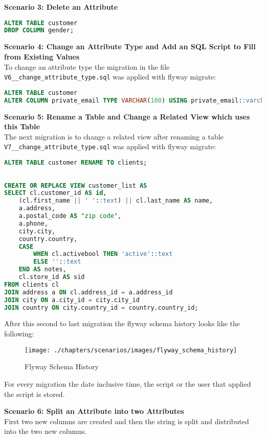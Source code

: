 \textbf{Scenario 3: Delete an Attribute}\\
%

\begin{lstlisting}[language=SQL]
ALTER TABLE customer
DROP COLUMN gender;
\end{lstlisting}


\textbf{Scenario 4: Change an Attribute Type and Add an SQL Script to Fill from Existing Values}\\
To change an attribute type the migration in the file \texttt{V6\_\_change\_attribute\_type.sql} was applied with flyway migrate:
\begin{lstlisting}[language=SQL]
ALTER TABLE customer
ALTER COLUMN private_email TYPE VARCHAR(100) USING private_email::varchar;
\end{lstlisting}


\textbf{Scenario 5: Rename a Table and Change a Related View which uses this Table}\\
%
The next migration is to change a related view after renaming a table\\
\texttt{V7\_\_change\_attribute\_type.sql} was applied with flyway migrate:
\begin{lstlisting}[language=SQL]
ALTER TABLE customer RENAME TO clients;
	
	
CREATE OR REPLACE VIEW customer_list AS
SELECT cl.customer_id AS id,
	(cl.first_name || ' '::text) || cl.last_name AS name,
	a.address,
	a.postal_code AS "zip code",
	a.phone,
	city.city,
	country.country,
	CASE
		WHEN cl.activebool THEN 'active'::text
		ELSE ''::text
	END AS notes,
	cl.store_id AS sid
FROM clients cl
JOIN address a ON cl.address_id = a.address_id
JOIN city ON a.city_id = city.city_id
JOIN country ON city.country_id = country.country_id;
\end{lstlisting}

After this second to last migration the flyway schema history looks like the following:
\begin{figure}[H]
	\centering
	\texttt{[image: ./chapters/scenarios/images/flyway\_schema\_history]}
	\caption[Flyway Schema History - Source: Own illustration]{Flyway Schema History}
\end{figure}
For every migration the date inclusive time, the script or the user that applied the script is stored.

\newpage
\textbf{Scenario 6: Split an Attribute into two Attributes}\\
%
First two new columns are created and then the string is split and distributed into the two new columns.

